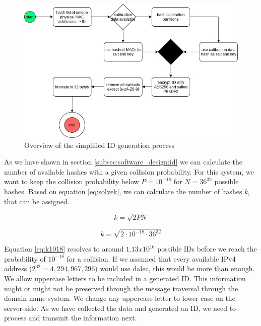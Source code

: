      \begin{figure}
         \centering
         \includegraphics[width=\textwidth]{latex/figures/id_generation.jpg}
         \caption{Overview of the simplified ID generation process}
         \label{fig:id_gen}
     \end{figure}
    
     As we have shown in section \ref{subsec:software_design:id} we can calculate the number of available hashes with a given collision probability. For this system, we want to keep the collision probability below $P = 10^{-18}$ for $N = 36^{32}$ possible hashes.
     Based on equation \ref{eq:solvek}, we can calculate the number of hashes \textit{k}, that can be assigned.
     
     \begin{equation*}
         k = \sqrt{2PN}
     \end{equation*}
     
     \begin{equation}
        \label{eq:k1018}
         k = \sqrt{2 \cdot  10^{-18} \cdot 36^{32}}
     \end{equation}
     
     Equation \ref{eq:k1018} resolves to around $1.13x10^{16}$ possible IDs before we reach the probability of $10^{-18}$ for a collision. If we assumed that every available IPv4 address ($2^{32} = 4,294,967,296)$ would use dalec, this would be more than enough.\\
     
     We allow uppercase letters to be included in a generated ID. This information might or might not be preserved through the message traversal through the domain name system. We change any uppercase letter to lower case on the server-side. 
     As we have collected the data and generated an ID, we need to process and transmit the information next.
     
